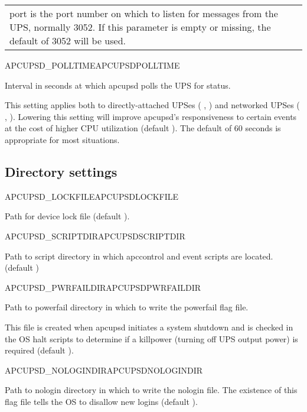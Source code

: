 \begin{description}
\begin{tabular}{p{20mm}p{120mm}}
  port is the port number on which to listen for messages from the UPS, normally 
  3052. If this parameter is empty or missing, the 
  default of 3052 will be used.
  \\
\end{tabular}

 {APCUPSD\_POLLTIME}{APCUPSDPOLLTIME}

  Interval in seconds at which apcupsd polls the UPS for status.
  
  This setting applies both to directly-attached UPSes 
  ( , ) 
  and networked UPSes ( 
  , ). 
  Lowering this setting will improve apcupsd's responsiveness to certain
  events at the cost of higher CPU utilization (default ).
  The default of 60 seconds is appropriate for most situations.

\end {description}

\subsection{Directory settings}
\begin {description}

 {APCUPSD\_LOCKFILE}{APCUPSDLOCKFILE}
  
  Path for device lock file (default ).
  

 {APCUPSD\_SCRIPTDIR}{APCUPSDSCRIPTDIR}
    
  Path to script directory in which apccontrol and event scripts are located.
  (default )


 {APCUPSD\_PWRFAILDIR}{APCUPSDPWRFAILDIR}

  Path to powerfail directory in which to write the powerfail flag file. 
  
  This file is created when apcupsd initiates a system shutdown and is
  checked in the OS halt scripts to determine if a killpower
  (turning off UPS output power) is required (default ).


 {APCUPSD\_NOLOGINDIR}{APCUPSDNOLOGINDIR}

  Path to nologin directory in which to write the nologin file.
  The existence of this flag file tells the OS to disallow new logins 
  (default ).

\end {description}

